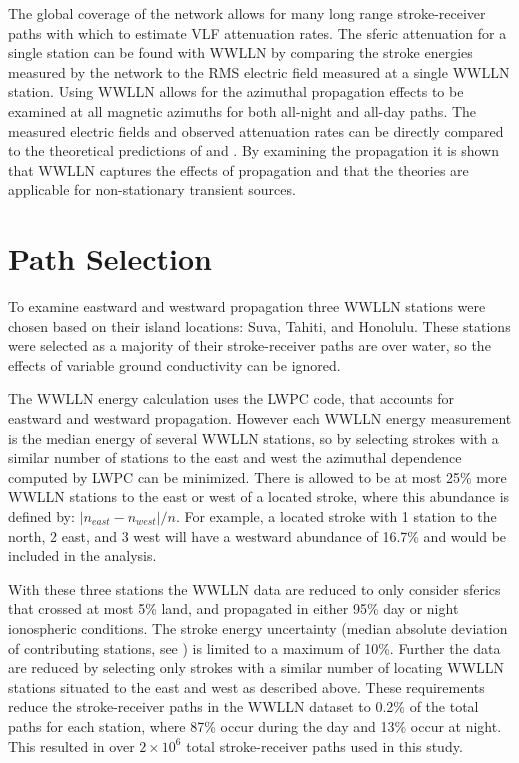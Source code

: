 The global coverage of the network allows for many long range stroke-receiver paths with which to estimate VLF attenuation rates.
The sferic attenuation for a single station can be found with WWLLN by comparing the stroke energies measured by the network to the RMS electric field measured at a single WWLLN station.
Using WWLLN allows for the azimuthal propagation effects to be examined at all magnetic azimuths for both all-night and all-day paths.
The measured electric fields and observed attenuation rates can be directly compared to the theoretical predictions of \citet{Wait1960a} and \citet{Taylor1960a}.
By examining the propagation it is shown that WWLLN captures the effects of propagation and that the theories are applicable for non-stationary transient sources.

\section{Path Selection}

To examine eastward and westward propagation three WWLLN stations were chosen based on their island locations: Suva, Tahiti, and Honolulu.
These stations were selected as a majority of their stroke-receiver paths are over water, so the effects of variable ground conductivity can be ignored. 

The WWLLN energy calculation uses the LWPC code, that accounts for eastward and westward propagation.
However each WWLLN energy measurement is the median energy of several WWLLN stations, so by selecting strokes with a similar number of stations to the east and west the azimuthal dependence computed by LWPC can be minimized.
There is allowed to be at most 25\% more WWLLN stations to the east or west of a located stroke, where this abundance is defined by: $|n_{east} - n_{west}| / n$.
For example, a located stroke with 1 station to the north, 2 east, and 3 west will have a westward abundance of 16.7\% and would be included in the analysis.

With these three stations the WWLLN data are reduced to only consider sferics that crossed at most 5\% land, and propagated in either 95\% day or night ionospheric conditions.
The stroke energy uncertainty (median absolute deviation of contributing stations, see \citet{Hutchins2012}) is limited to a maximum of 10\%.
Further the data are reduced by selecting only strokes with a similar number of locating WWLLN stations situated to the east and west as described above.
These requirements reduce the stroke-receiver paths in the WWLLN dataset to 0.2\% of the total paths for each station, where 87\% occur during the day and 13\% occur at night.
This resulted in over $2\times10^6$ total stroke-receiver paths used in this study.

